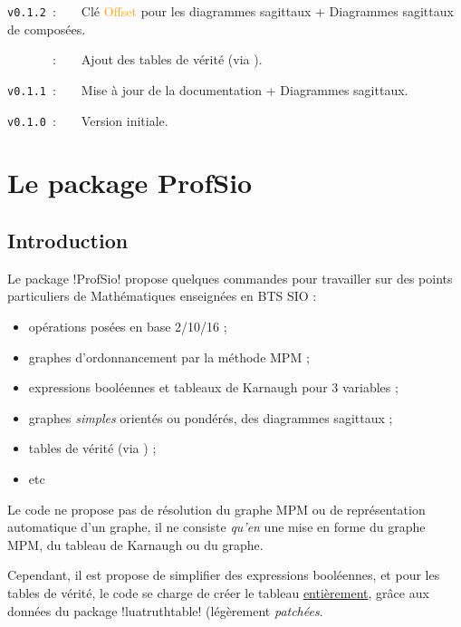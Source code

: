 \documentclass[french,a4paper,11pt]{article}
\newcommand\Cle[1]{{\small\sffamily\textlangle \textcolor{orange}{#1}\textrangle}}
\begin{document}
{{\verb|v0.1.2|~:~~~~Clé \Cle{Offset} pour les diagrammes sagittaux + Diagrammes sagittaux de composées.

\verb|      |~:~~~~Ajout des tables de vérité (via ).

\verb|v0.1.1|~:~~~~Mise à jour de la documentation + Diagrammes sagittaux.

\verb|v0.1.0|~:~~~~Version initiale.

\newpage

\section{Le package ProfSio}

\subsection{Introduction}

\begin{noteblock}
Le package \packagetex!ProfSio! propose quelques commandes pour travailler sur des points particuliers de Mathématiques enseignées en BTS SIO :

\begin{itemize}
	\item opérations posées en base 2/10/16 ;
	\item graphes d'ordonnancement par la méthode MPM ;
	\item expressions booléennes et tableaux de Karnaugh pour 3 variables ;
	\item graphes \textit{simples} orientés ou pondérés, des diagrammes sagittaux ;
	\item tables de vérité (via ) ;
	\item etc
\end{itemize}
\vspace*{-\baselineskip}\leavevmode
\end{noteblock}

\begin{warningblock}
Le code ne propose pas de \og résolution \fg{} du graphe MPM ou de représentation \og automatique \fg{} d'un graphe, il ne consiste \textit{qu'en} une mise en forme du graphe MPM, du tableau de Karnaugh ou du graphe.

\smallskip

Cependant, il est propose de \og simplifier \fg{} des expressions booléennes, et pour les tables de vérité, le code se charge de créer le tableau \underline{entièrement}, grâce aux données du package \packagetex!luatruthtable! (légèrement \textit{patchées}.
\end{warningblock}

}}
\end{document}
